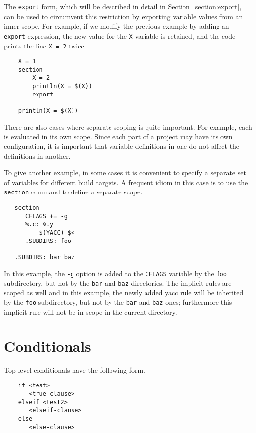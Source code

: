 The \verb+export+ form, which will be described in detail in
Section~\ref{section:export}, can be used to circumvent this restriction by
exporting variable values from an inner scope.
For example, if we modify the previous example
by adding an \verb+export+ expression, the new value for the \verb+X+
variable is retained, and the code prints the line \verb+X = 2+ twice.

\begin{verbatim}
    X = 1
    section
        X = 2
        println(X = $(X))
        export

    println(X = $(X))
\end{verbatim}

There are also cases where separate scoping is quite important.  For example,
each  is evaluated in its own scope.  Since each part of a project
may have its own configuration, it is important that variable definitions in one
 do not affect the definitions in another.

To give another example, in some cases it is convenient to specify a
separate set of variables for different build targets.  A frequent
idiom in this case is to use the \verb+section+ command to define a
separate scope.

\begin{verbatim}
   section
      CFLAGS += -g
      %.c: %.y
          $(YACC) $<
      .SUBDIRS: foo

   .SUBDIRS: bar baz
\end{verbatim}

In this example, the \verb+-g+ option is added to the \verb+CFLAGS+
variable by the \verb+foo+ subdirectory, but not by the \verb+bar+ and
\verb+baz+ directories. The implicit rules are scoped as well and in this
example, the newly added yacc rule will be inherited by the \verb+foo+
subdirectory, but not by the \verb+bar+ and \verb+baz+ ones; furthermore
this implicit rule will not be in scope in the current directory.

\section{Conditionals}
\label{section:conditionals}

Top level conditionals have the following form.

\begin{verbatim}
    if <test>
       <true-clause>
    elseif <test2>
       <elseif-clause>
    else
       <else-clause>
\end{verbatim}

